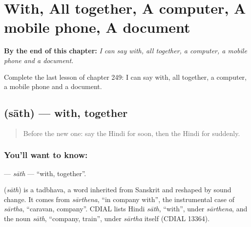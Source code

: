 
\chapter{With, All together, A computer, A mobile phone, A document}
\label{ch:hi-with-all-together-a-computer-a-mobile-phone-a-document}

\begin{chapteropening}
\textbf{By the end of this chapter:} \emph{I can say with, all together, a computer, a mobile phone and a document.}

Complete the last lesson of chapter 249: I can say with, all together, a computer, a mobile phone and a document.
\end{chapteropening}

\section[\texorpdfstring{\hi{साथ} (sāth)}{साथ (sāth)}]{ (sāth) — with, together}

\label{lesson:HI-C249-sath}



\begin{quote}
Before the new one: say the Hindi for soon, then the Hindi for suddenly.
\end{quote}

\subsection*{You'll want to know: }
\textbf{} — \emph{sāth} — \textquotedblleft{}with, together\textquotedblright{}.

\begin{cousinweb}
\textbf{} (\emph{sāth}) is a tadbhava, a word inherited from Sanskrit and reshaped by sound change. It comes from \emph{sārthena}, \textquotedblleft{}in company with\textquotedblright{}, the instrumental case of \emph{sārtha}, \textquotedblleft{}caravan, company\textquotedblright{}. CDIAL lists Hindi \emph{sāth}, \textquotedblleft{}with\textquotedblright{}, under \emph{sārthena}, and the noun \emph{sāth}, \textquotedblleft{}company, train\textquotedblright{}, under \emph{sārtha} itself (CDIAL 13364).
\end{cousinweb}

